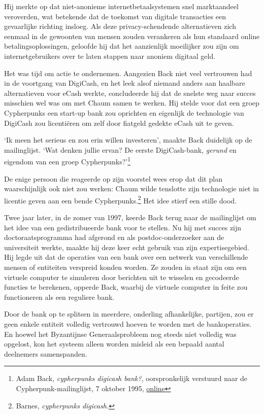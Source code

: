\documentclass[
  a5paper,
  smalldemyvopaper,11pt,twoside,onecolumn,openright,extrafontsizes,
hidelinks]{memoir}
\begin{document}
Hij merkte op dat niet-anonieme internetbetaalsystemen snel marktaandeel
veroverden, wat betekende dat de toekomst van digitale transacties een
gevaarlijke richting insloeg. Als deze privacy-schendende alternatieven
zich eenmaal in de gewoonten van mensen zouden verankeren als hun
standaard online betalingsoplossingen, geloofde hij dat het aanzienlijk
moeilijker zou zijn om internetgebruikers over te laten stappen naar
anoniem digitaal geld.

Het was tijd om actie te ondernemen. Aangezien Back niet veel vertrouwen
had in de voortgang van DigiCash, en het leek alsof niemand anders aan
haalbare alternatieven voor eCash werkte, concludeerde hij dat de
snelste weg naar succes misschien wel was om met Chaum samen te werken.
Hij stelde voor dat een groep Cypherpunks een start-up bank zou
oprichten en eigenlijk de technologie van DigiCash zou licentiëren om
zelf door fiatgeld gedekte eCash uit te geven.

`Ik meen het serieus en zou erin willen investeren', maakte Back
duidelijk op de mailinglijst. `Wat denken jullie ervan? De eerste
DigiCash-bank, \emph{gerund} en eigendom van een groep
Cypherpunks?'\footnote{Adam Back, \emph{cypherpunks digicash bank?},
  oorspronkelijk verstuurd naar de Cypherpunk-mailinglijst, 7 oktober
  1995,
  \href{https://cypherpunks.venona.com/date/1995/10/msg00690.html}{online}}

De enige persoon die reageerde op zijn voorstel wees erop dat dit plan
waarschijnlijk ook niet zou werken: Chaum wilde tenslotte zijn
technologie niet in licentie geven aan een bende Cypherpunks.\footnote{Barnes,
  \emph{cypherpunks digicash.}} Het idee stierf een stille dood.

Twee jaar later, in de zomer van 1997, keerde Back terug naar de
mailinglijst om het idee van een gedistribueerde bank voor te stellen.
Nu hij met succes zijn doctoraatsprogramma had afgerond en als
postdoc-onderzoeker aan de universiteit werkte, maakte hij deze keer
echt gebruik van zijn expertisegebied. Hij legde uit dat de operaties
van een bank over een netwerk van verschillende mensen of entiteiten
verspreid konden worden. Ze zouden in staat zijn om een virtuele
computer te simuleren door berichten uit te wisselen en gecodeerde
functies te berekenen, opperde Back, waarbij de virtuele computer in
feite zou functioneren als een reguliere bank.

Door de bank op te splitsen in meerdere, onderling afhankelijke,
partijen, zou er geen enkele entiteit volledig vertrouwd hoeven te
worden met de bankoperaties. En hoewel het Byzantijnse Generaalsprobleem
nog steeds niet volledig was opgelost, kon het systeem alleen worden
misleid als een bepaald aantal deelnemers samenspanden.
\end{document}
